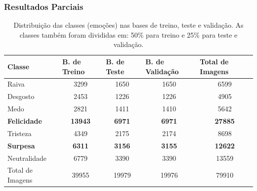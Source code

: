 \documentclass{beamer}
\begin{document}
\begin{frame}
\frametitle{Resultados Parciais}
\begin{table}[]
\tiny
\centering
\caption{Distribuição das classes (emoções) nas bases de treino, teste e validação. As classes também foram divididas em: 50\% para treino e 25\% para teste e validação.}
\label{table:distclasse}
\begin{tabular}{lcccc}
\hline
\textbf{Classe}  & \multicolumn{1}{l}{\textbf{B. de Treino}} & \multicolumn{1}{l}{\textbf{B. de Teste}} & \multicolumn{1}{l}{\textbf{B. de Validação}} & \multicolumn{1}{l}{\textbf{Total de Imagens}} \\ \hline
Raiva            & 3299                                        & 1650                                       & 1650                                           & 6599                                          \\
Desgosto         & 2453                                        & 1226                                       & 1226                                           & 4905                                          \\
Medo             & 2821                                        & 1411                                       & 1410                                           & 5642                                          \\
\scriptsize \textbf{Felicidade}       & \scriptsize \textbf{13943}                                       & \scriptsize \textbf{6971}                                       & \scriptsize \textbf{6971}                                           & \scriptsize \textbf{27885}                                         \\
Tristeza         & 4349                                        & 2175                                       & 2174                                           & 8698                                          \\
\scriptsize \textbf{Surpesa}          & \scriptsize \textbf{6311}                                        & \scriptsize \textbf{3156}                                       & \scriptsize \textbf{3155}                                           & \scriptsize \textbf{12622}                                         \\
\scriptsize Neutralidade     & \scriptsize 6779                                        & \scriptsize 3390                                       & \scriptsize 3390                                           & \scriptsize 13559                                         \\
Total de Imagens & 39955                                       & 19979                                      & 19976                                          & 79910                                         \\ \hline
\end{tabular}
\end{table}
\end{frame}
\end{document}
